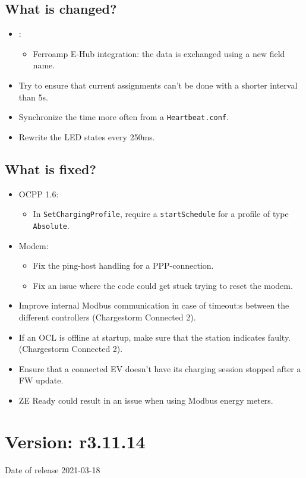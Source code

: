 \documentclass{scrartcl}
\begin{document}
\subsection*{What is changed?}
\begin{itemize}
\item \nanogrid:
  \begin{itemize}
  \item Ferroamp E-Hub integration: the data is exchanged using a new field name.
  \end{itemize}
\item Try to ensure that current assignments can't be done with a shorter
  interval than 5s.
\item Synchronize the time more often from a \verb|Heartbeat.conf|.
\item Rewrite the LED states every 250ms.
\end{itemize}
\subsection*{What is fixed?}
\begin{itemize}
\item OCPP 1.6:
  \begin{itemize}
  \item In \verb|SetChargingProfile|, require a \verb|startSchedule| for a
    profile of type \verb|Absolute|.
  \end{itemize}
\item Modem:
  \begin{itemize}
  \item Fix the ping-host handling for a PPP-connection.
  \item Fix an issue where the code could get stuck trying to reset the modem.
  \end{itemize}
\item Improve internal Modbus communication in case of timeout:s between the
  different controllers (Chargestorm Connected 2).
\item If an OCL is offline at startup, make sure that the station indicates
  faulty. (Chargestorm Connected 2).
\item Ensure that a connected EV doesn't have its charging session stopped
  after a FW update.
\item ZE Ready could result in an issue when using Modbus energy meters.
\end{itemize}

\section{Version: r3.11.14}
Date of release 2021-03-18
\end{document}
